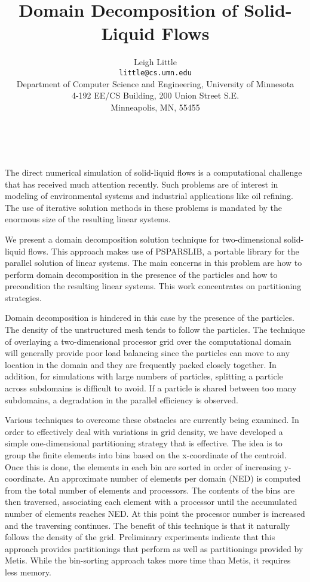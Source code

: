 \documentclass[11pt]{article}
\date{ ~ \hspace{-4mm}}
\title{Domain Decomposition of Solid-Liquid Flows  }
\author{Leigh Little \\ {\tt  little@cs.umn.edu} \\ Department of Computer Science and Engineering, University of Minnesota \\ 4-192 EE/CS Building, 200 Union Street S.E. \\ Minneapolis, MN, 55455}
\begin{document}
\maketitle
\thispagestyle{empty}





 




The direct numerical simulation of solid-liquid flows is 
a computational challenge that has received much attention
recently.
Such problems are of interest in modeling of environmental systems
and industrial applications like oil refining. 
The use of iterative solution methods in these problems is
mandated by the enormous size of the resulting linear systems.
 




We present a domain decomposition solution technique for two-dimensional
solid-liquid flows.  This approach makes use of PSPARSLIB, a  
portable library for the parallel solution of linear systems. 
The main concerns in this problem are how to
perform domain decomposition in the presence of the particles and
how to precondition the resulting linear systems.  This work
concentrates on partitioning strategies.





Domain decomposition is hindered in this case by the presence
of the particles.  The density of the unstructured 
mesh tends to follow the particles.  The technique of overlaying
a two-dimensional processor grid over the computational domain
will generally provide poor load balancing since the particles
can move to any location in the domain and they are frequently packed
closely together.  In addition, for simulations with large numbers
of particles, splitting a particle across subdomains is difficult to 
avoid. 	 If a particle is shared between too many subdomains, a degradation
in the parallel efficiency is observed.  





Various techniques to overcome these obstacles are currently being 
examined.   In order to effectively deal with variations in grid density,
we have developed a simple one-dimensional partitioning strategy 
that is effective.  The 
idea is to group the finite elements into bins based on the 
x-coordinate of the centroid.  Once this is done, the elements in
each bin are sorted in order of increasing y-coordinate.  
An approximate number of elements per domain (NED) is computed from the
total number of elements and processors.  The contents of the bins
are then traversed, associating each element with a processor until
the accumulated number of elements reaches NED.  At this point 
the processor number is increased and the traversing continues.  
The benefit of this technique is that it naturally follows the density 
of the grid.  Preliminary experiments
indicate that this approach provides partitionings that perform
as well as partitionings provided by Metis.  While the bin-sorting
approach takes more time than Metis, it requires less memory.  
\end{document}
